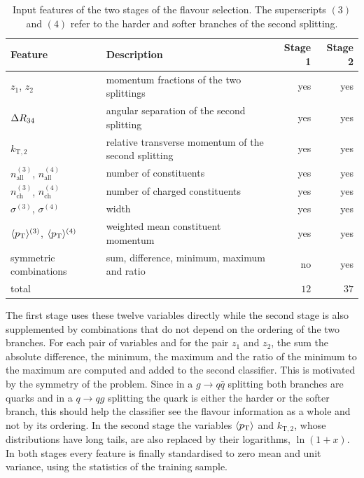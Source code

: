 \begin{table}[htbp]
  \centering
  \caption{Input features of the two stages of the flavour selection. The
  superscripts $(3)$ and $(4)$ refer to the harder and softer branches of the
  second splitting.}
  \label{tab:features}
  \begin{tabular}{llrr}
    \toprule
    Feature & Description & Stage 1 & Stage 2 \\
    \midrule
    $z_1$, $z_2$ & momentum fractions of the two splittings & yes & yes \\
    $\Delta R_{34}$ & angular separation of the second splitting & yes & yes \\
    $k_{\mathrm{T},2}$ & relative transverse momentum of the second splitting
      & yes & yes \\
    $n_{\text{all}}^{(3)}$, $n_{\text{all}}^{(4)}$ & number of constituents
      & yes & yes \\
    $n_{\text{ch}}^{(3)}$, $n_{\text{ch}}^{(4)}$ & number of charged constituents
      & yes & yes \\
    $\sigma^{(3)}$, $\sigma^{(4)}$ & width & yes & yes \\
    $\langle p_{\mathrm{T}} \rangle^{(3)}$, $\langle p_{\mathrm{T}} \rangle^{(4)}$
      & weighted mean constituent momentum & yes & yes \\
    symmetric combinations & sum, difference, minimum, maximum and ratio
      & no & yes \\
    \midrule
    total & & $12$ & $37$ \\
    \bottomrule
  \end{tabular}
\end{table}

The first stage uses these twelve variables directly while the second stage is also supplemented 
by combinations that do not depend on the ordering of the two
branches. For each pair of variables and for the pair $z_1$ and $z_2$, the sum 
the absolute difference, the minimum, the maximum and the ratio of the minimum to the maximum 
are computed and added to the second classifier. This is motivated by the symmetry of 
the problem. Since in a $g \to q\bar{q}$ splitting both branches are quarks and in a 
$q \to qg$ splitting the quark is either the harder or the softer branch, this should help
the classifier see the flavour information as a whole and not by its ordering. 
In the second stage the variables $\langle p_{\mathrm{T}} \rangle$ and $k_{\mathrm{T},2}$,
whose distributions have long tails, are also replaced by their logarithms,
$\ln(1 + x)$. In both stages every feature is finally standardised to zero mean
and unit variance, using the statistics of the training sample.

